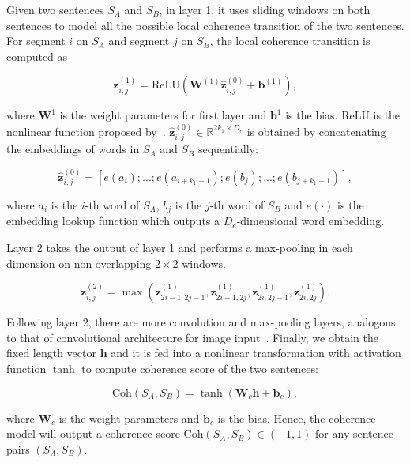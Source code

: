 	Given two sentences $S_A$ and $S_B$, in layer 1, it uses sliding windows on both sentences to model all the possible local coherence transition of the two sentences. For segment $i$ on $S_A$ and segment $j$ on $S_B$, the local coherence transition is computed as

\begin{equation*}
	\mathbf{z}^{(1)}_{i,j}  = \text{ReLU}(\mathbf{W}^{(1)} \hat{\mathbf{z}}^{(0)}_{i,j} + \mathbf{b}^{(1)}),
	\end{equation*}

	where $\mathbf{W}^1$ is the weight parameters for first layer and $\mathbf{b}^1$ is the bias. ReLU is the nonlinear function proposed by~\cite{relu}. $\hat{\mathbf{z}}^{(0)}_{i,j} \in \mathbb{R}^{2k_1 \times D_{e}}$ is obtained by concatenating the embeddings of words in $S_A$ and $S_B$ sequentially:

\begin{equation*}
	\hat{\mathbf{z}}^{(0)}_{i,j} =  [e(a_i); ... ; e(a_{i+k_1-1}); e(b_j);...; e(b_{j+k_1-1})],
	\end{equation*}

	where $a_i$ is the $i$-th word of $S_A$, $b_j$ is the $j$-th word of $S_B$ and $e(\cdot)$ is the embedding lookup function which outputs a $D_e$-dimensional word embedding.

	Layer 2 takes the output of layer 1 and performs a max-pooling in each dimension on non-overlapping $2\times2$ windows.

\begin{equation*}
	\mathbf{z}_{i,j}^{(2)} = \max(\mathbf{z}_{2i-1,2j-1}^{(1)}, \mathbf{z}_{2i-1,2j}^{(1)},\mathbf{z}_{2i,2j-1}^{(1)},\mathbf{z}_{2i,2j}^{(1)}). 

	\end{equation*}

	Following layer 2, there are more convolution and  max-pooling layers, analogous to that of convolutional architecture for image input~\cite{cnn}. Finally, we obtain the fixed length vector $\mathbf{h}$ and it is fed into a nonlinear transformation with activation function $\tanh$ to compute coherence score of the two sentences:

\begin{equation}\label{eq:coh}
	\text{Coh}(S_A,S_B) = \tanh(\mathbf{W}_c  \mathbf{h}+ \mathbf{b}_c), 
	\end{equation}

	where $\mathbf{W}_c$ is the weight parameters and $\mathbf{b}_c$ is the bias. Hence, the coherence model will output a coherence score  $\text{Coh}(S_A, S_B) \in (-1,1)$ for any sentence pairs $(S_A, S_B)$.

